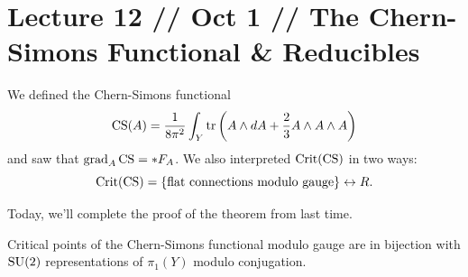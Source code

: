 \documentclass[main]{subfiles}
\begin{document}
\section*{Lecture 12 // Oct 1 // The Chern-Simons Functional \& Reducibles}

\begin{recall}
We defined the Chern-Simons functional
\[
\operatorname{CS}(A) = \frac{1}{8\pi^2}\int_Y \operatorname{tr}\left(A\wedge dA + \frac{2}{3}A\wedge A\wedge A\right)
\]
and saw that $\operatorname{grad}_A \operatorname{CS} = \ast F_A$. We also interpreted $\operatorname{Crit}(\operatorname{CS})$ in two ways:
\[
\operatorname{Crit}(\operatorname{CS}) = \{\text{flat connections modulo gauge}\} \leftrightarrow R.
\]
\end{recall}

Today, we'll complete the proof of the theorem from last time.

\begin{theorem*}
Critical points of the Chern-Simons functional modulo gauge are in bijection with $\operatorname{SU}(2)$ representations of $\pi_1(Y)$ modulo conjugation.
\end{theorem*}
\end{document}
